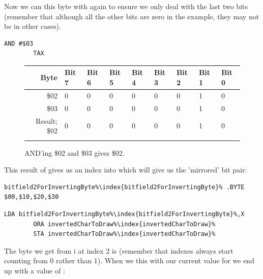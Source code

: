 Now we can  this byte with  again to ensure we only deal with the last two bits
(remember that although all the other bits are zero in the example, they may not be in other cases).

\begin{lstlisting}[escapechar=\%]
        AND #$03
        TAX
\end{lstlisting}

\begin{figure}[H]
  {
    \setlength{\tabcolsep}{3.0pt}
    \setlength\cmidrulewidth{\heavyrulewidth} %
    \begin{adjustbox}{width=10cm,center}

      \begin{tabular}{rllllllll}
        \toprule
        Byte & Bit 7 & Bit 6 & Bit 5 & Bit 4 & Bit 3 & Bit 2 & Bit 1 & Bit 0        \\
        \midrule
        \$02 & 0 & 0 & 0 & 0 & 0 & 0 & 1 & 0 \\
        \$03 & 0 & 0 & 0 & 0 & 0 & 0 & 1 & 0 \\
        \midrule
        Result; \$02 & 0 & 0 & 0 & 0 & 0 & 0 & 1 & 0 \\
        \addlinespace
        \bottomrule
      \end{tabular}

    \end{adjustbox}

  }\caption*{AND'ing \$02 and \$03 gives \$02.}
\end{figure}
\vspace{-0.5cm}

This result of  gives us an index into  which will
give us the 'mirrored' bit pair:

\begin{lstlisting}[escapechar=\%]
bitfield2ForInvertingByte%\index{bitfield2ForInvertingByte}% .BYTE $00,$10,$20,$30
\end{lstlisting}
\begin{lstlisting}[escapechar=\%]
        LDA bitfield2ForInvertingByte%\index{bitfield2ForInvertingByte}%,X
        ORA invertedCharToDraw%\index{invertedCharToDraw}%
        STA invertedCharToDraw%\index{invertedCharToDraw}%
\end{lstlisting}

The byte we get from i at index 2 is  (remember that indexes
always start counting from 0 rather than 1). When we  this with our current value for
 we end up with a value of :


